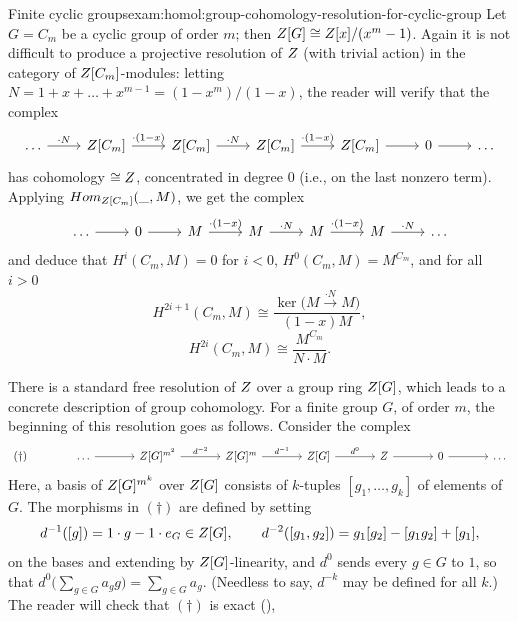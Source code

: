 \begin{exam}{Finite cyclic groups}{exam:homol:group-cohomology-resolution-for-cyclic-group}
  Let $G = C_m$ be a cyclic group of order $m$; then
  $Z[G] \cong Z[x]/(x^m - 1)$. Again it is not difficult to produce
  a projective resolution of $Z$ (with trivial action) in the
  category of $Z[C_m]$-modules: letting
  $N = 1 + x + \dots + x^{m-1} = (1 - x^m)/(1 - x)$, the reader will
  verify that the complex
  \[\begin{tikzcd}
      \dots \arrow[r, "\cdot N"] & \Z[C_m] \arrow[r, "\cdot(1-x)"] &
      \Z[C_m] \arrow[r, "\cdot N"] & \Z[C_m] \arrow[r, "\cdot(1-x)"] &
      \Z[C_m] \arrow[r] & 0 \arrow[r] & \dots
    \end{tikzcd}\] has cohomology $\cong Z$, concentrated in degree
  $0$ (i.e., on the last nonzero term). Applying
  $Hom_{Z[C_m]}(\_, M)$, we get the complex
  \[\begin{tikzcd}
      \dots \arrow[r] & 0 \arrow[r] & M \arrow[r, "\cdot(1-x)"] & M
      \arrow[r, "\cdot N"] & M \arrow[r, "\cdot(1-x)"] & M \arrow[r,
      "\cdot N"] & \dots
    \end{tikzcd}\] and deduce that $H^i(C_m, M) = 0$ for $i < 0$,
  $H^0(C_m, M) = M^{C_m}$, and for all $i > 0$
  \[
    H^{2i+1}(C_m, M) \cong \frac{\ker\bigl(M \xrightarrow{\cdot N}
      M\bigr)}{(1-x)M},
  \]
  \[
    H^{2i}(C_m, M) \cong \frac{M^{C_m}}{N \cdot M}.
  \]
\end{exam}
There is a standard free resolution of $Z$ over a group ring $Z[G]$,
which leads to a concrete description of group cohomology.  For a
finite group $G$, of order $m$, the beginning of this resolution goes
as follows. Consider the complex
\[\begin{tikzcd}[column sep=large]
    (\dagger) & \dots \arrow[r] & \Z[G]^{m^2} \arrow[r, "d^{-2}"] &
    \Z[G]^m \arrow[r, "d^{-1}"] & \Z[G] \arrow[r, "d^0"] & \Z
    \arrow[r] & 0 \arrow[r] & \dots
  \end{tikzcd}\] Here, a basis of $Z[G]^{m^k}$ over $Z[G]$ consists
of $k$-tuples $[g_1, \dots, g_k]$ of elements of $G$. The morphisms in
$(\dagger)$ are defined by setting
\[
  d^{-1}([g]) = 1 \cdot g - 1 \cdot e_G \in Z[G], \qquad d^{-2}([g_1,
  g_2]) = g_1[g_2] - [g_1g_2] + [g_1],
\]
on the bases and extending by $Z[G]$-linearity, and $d^0$ sends every
$g \in G$ to $1$, so that
$d^0\bigl(\sum_{g \in G} a_g g\bigr) = \sum_{g \in G} a_g$. (Needless
to say, $d^{-k}$ may be defined for all $k$.) The reader will check
that $(\dagger)$ is exact
(),
